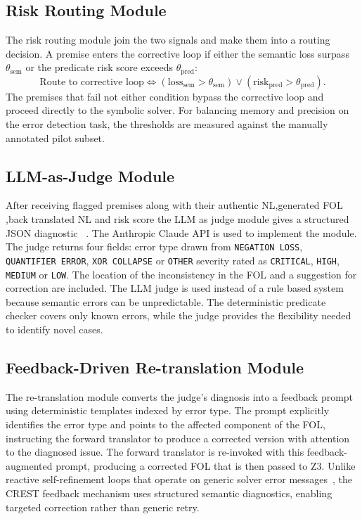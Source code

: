 \subsection{Risk Routing Module}

The risk routing module join the two signals and make them into a routing decision. A premise enters the corrective loop if either the semantic loss  surpass $\theta_{\text{sem}}$ or the predicate risk score exceeds $\theta_{\text{pred}}$:
\[
\text{Route to corrective loop} \iff (\text{loss}_{\text{sem}} > \theta_{\text{sem}}) \lor (\text{risk}_{\text{pred}} > \theta_{\text{pred}}).
\]
The premises that fail not either condition bypass the corrective loop and proceed directly to the symbolic solver. For balancing memory and precision on the error detection task, the thresholds are measured against the manually annotated pilot subset.

\subsection{LLM-as-Judge Module}

After receiving flagged premises along with their authentic NL,generated FOL ,back translated NL and risk score the LLM as judge module gives a structured JSON diagnostic ~\cite{zheng2023judging}. The Anthropic Claude API is used to implement the module. The judge returns four fields: error type drawn from \texttt{NEGATION\ LOSS}, \texttt{QUANTIFIER\ ERROR}, \texttt{XOR\ COLLAPSE} or \texttt{OTHER} severity rated as \texttt{CRITICAL}, \texttt{HIGH}, \texttt{MEDIUM} or \texttt{LOW}. The location of the inconsistency in the FOL and a suggestion for correction are included. The LLM judge is used instead of a rule based system because semantic errors can be unpredictable. The deterministic predicate checker covers only known errors, while the judge provides the flexibility needed to identify novel cases.

\subsection{Feedback-Driven Re-translation Module}

The re-translation module converts the judge's diagnosis into a feedback prompt using deterministic templates indexed by error type. The prompt explicitly identifies the error type and points to the affected component of the FOL, instructing the forward translator to produce a corrected version with attention to the diagnosed issue. The forward translator is re-invoked with this feedback-augmented prompt, producing a corrected FOL that is then passed to Z3. Unlike reactive self-refinement loops that operate on generic solver error messages~\cite{pan2023logiclm}, the CREST feedback mechanism uses structured semantic diagnostics, enabling targeted correction rather than generic retry.

